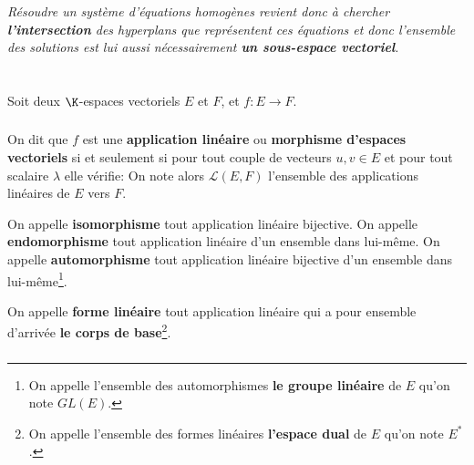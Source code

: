 \begin{center}
    \textit{
        Résoudre un système d'équations homogènes revient donc à chercher \textbf{l'intersection} des hyperplans que représentent ces équations et donc l'ensemble des solutions est lui aussi nécessairement \textbf{un sous-espace vectoriel}.
    }
\end{center}

\chapter*{} %

Soit deux \(\K\)-espaces vectoriels \(E\) et \(F\), et \(f : E \longrightarrow F \).

\subsection*{}

On dit que \(f\) est une \textbf{application linéaire} ou \textbf{morphisme d'espaces vectoriels} si et seulement si pour tout couple de vecteurs \(u, v \in E\) et pour tout scalaire \(\lambda\) elle vérifie: 
On note alors \(\mathcal{L}(E, F)\) l'ensemble des applications linéaires de \(E\) vers \(F\).\<

On appelle \textbf{isomorphisme} tout application linéaire bijective.\+
On appelle \textbf{endomorphisme} tout application linéaire d'un ensemble dans lui-même.\+
On appelle \textbf{automorphisme} tout application linéaire bijective d'un ensemble dans lui-même\footnote[1]{On appelle l'ensemble des automorphismes \textbf{le groupe linéaire} de \(E\) qu'on note \(GL(E)\).}.\<

On appelle \textbf{forme linéaire} tout application linéaire qui a pour ensemble d'arrivée \textbf{le corps de base}\footnote[2]{On appelle l'ensemble des formes linéaires \textbf{l'espace dual} de \(E\) qu'on note \(E^*\).}.

\subsection*{}

